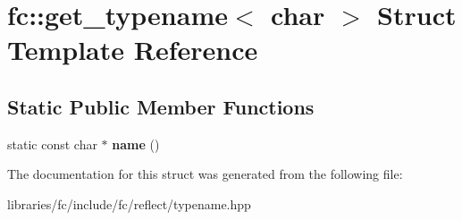 \hypertarget{structfc_1_1get__typename_3_01char_01_4}{}\section{fc\+:\+:get\+\_\+typename$<$ char $>$ Struct Template Reference}
\label{structfc_1_1get__typename_3_01char_01_4}
\subsection*{Static Public Member Functions}
\begin{DoxyCompactItemize}
\item 
\mbox{\label{structfc_1_1get__typename_3_01char_01_4_a54072476232b65fdb49cf79b57082b0a}} 
static const char $\ast$ {\bfseries name} ()
\end{DoxyCompactItemize}


The documentation for this struct was generated from the following file\+:\begin{DoxyCompactItemize}
\item 
libraries/fc/include/fc/reflect/typename.\+hpp\end{DoxyCompactItemize}
